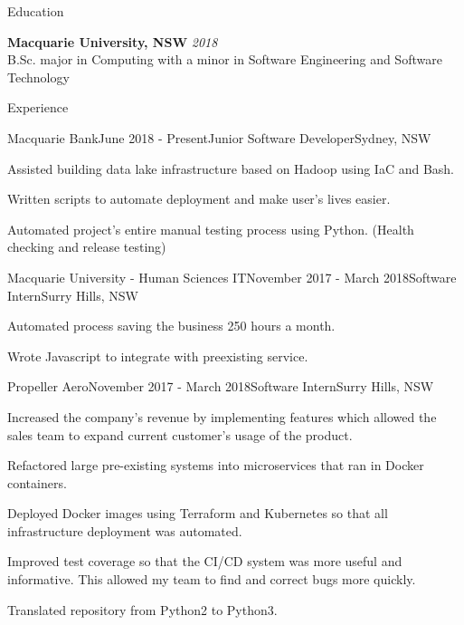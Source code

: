 \documentclass{resume} %
\begin{document}

\begin{rSection}{Education}

{\bf Macquarie University, NSW} \hfill {\em 2018} \\ 
B.Sc. major in Computing with a minor in Software Engineering and Software Technology\\

\end{rSection}


\begin{rSection}{Experience}


\begin{rSubsection}{Macquarie Bank}{June 2018 - Present}{Junior Software Developer}{Sydney, NSW}
\item Assisted building data lake infrastructure based on Hadoop using IaC and Bash.
\item Written scripts to automate deployment and make user's lives easier.
\item Automated project's entire manual testing process using Python. (Health checking and release testing) 
\end{rSubsection}

\begin{rSubsection}{Macquarie University - Human Sciences IT}{November 2017 - March 2018}{Software Intern}{Surry Hills, NSW}
\item Automated process saving the business 250 hours a month.
\item Wrote Javascript to integrate with preexisting service.
\end{rSubsection}

\begin{rSubsection}{Propeller Aero}{November 2017 - March 2018}{Software Intern}{Surry Hills, NSW}
\item Increased the company's revenue by implementing features which allowed the sales team to expand current customer's usage of the product.
\item Refactored large pre-existing systems into microservices that ran in Docker containers. 
\item Deployed Docker images using Terraform and Kubernetes so that all infrastructure deployment was automated.
\item Improved test coverage so that the CI/CD system was more useful and informative. This allowed my team to find and correct bugs more quickly.
\item Translated repository from Python2 to Python3.
\end{rSubsection}

\end{rSection}
\end{document}

